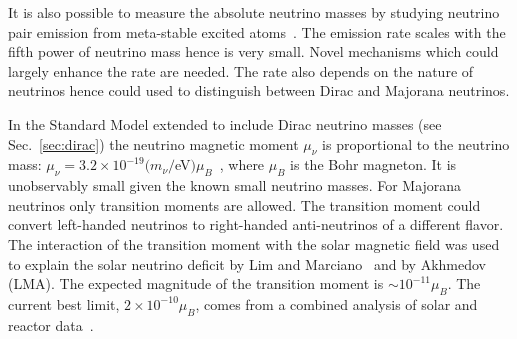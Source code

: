 It is also possible to measure the absolute neutrino masses by studying neutrino pair emission from meta-stable excited atoms~\cite{Yos07}. The emission rate scales with the fifth power of  neutrino mass hence is very small. Novel mechanisms which could largely enhance the rate are needed. The rate also depends on the nature of neutrinos hence could used to distinguish between Dirac and Majorana neutrinos.

In the Standard Model extended to include Dirac neutrino masses (see Sec.~\ref{sec:dirac}) the neutrino magnetic moment $\mu_{\nu}$ is proportional to the neutrino mass: $\mu_{\nu} = 3.2 \times 10^{-19}(m_{\nu}/$eV$)\mu_{B}$~\cite{Fuj80}, where $\mu_{B}$ is the Bohr magneton. It is unobservably small given the known small neutrino masses. For Majorana neutrinos only transition moments are allowed. The transition moment could convert left-handed neutrinos to right-handed anti-neutrinos of a different flavor. The interaction of the transition moment with the solar magnetic field was used to explain the solar neutrino deficit by Lim and Marciano~\cite{Lim88} and by Akhmedov ~\cite{Akh88} (LMA). The expected magnitude of the transition moment is $\sim 10^{-11}\mu_{B}$. The current best limit, $2 \times 10^{-10}\mu_{B}$, comes from a combined analysis of solar and reactor data~\cite{Gri02}.


